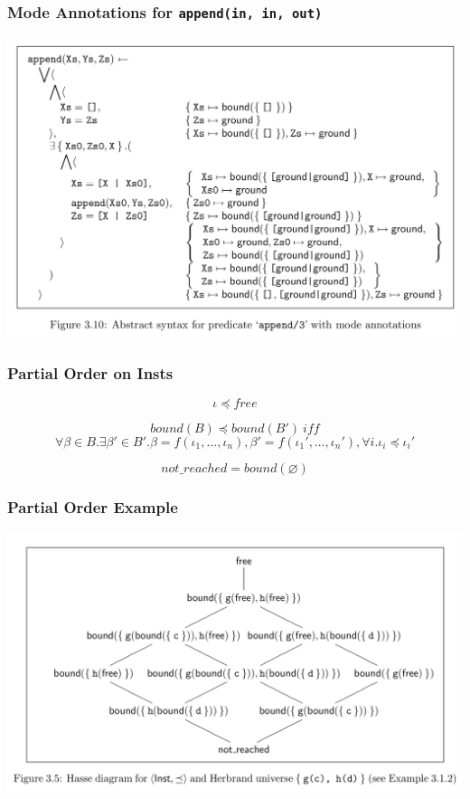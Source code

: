 \documentclass{beamer}
\begin{document}
\begin{frame}[fragile]
  \frametitle{Mode Annotations for \texttt{append(in, in, out)}}
\includegraphics[width=\textwidth]{ModeAnnot.png}
\end{frame}

\begin{frame}[fragile]
  \frametitle{Partial Order on Insts}
  $$
  \iota \preceq free
  $$

  \vfill

  $$
  bound(B) \preceq bound(B') \ iff
  $$
  $$
  \forall \beta \in B. \exists \beta' \in B'. \beta = f (\iota_1, \dots, \iota_n), \beta' = f (\iota_1', \dots, \iota_n'), \forall i. \iota_i \preceq \iota_i'
  $$

  \vfill

  $$
  not\_reached = bound(\varnothing)
  $$
\end{frame}

\begin{frame}[fragile]
  \frametitle{Partial Order Example}
\includegraphics[width=\textwidth]{pics/InstsPO.png}
\end{frame}
\end{document}
